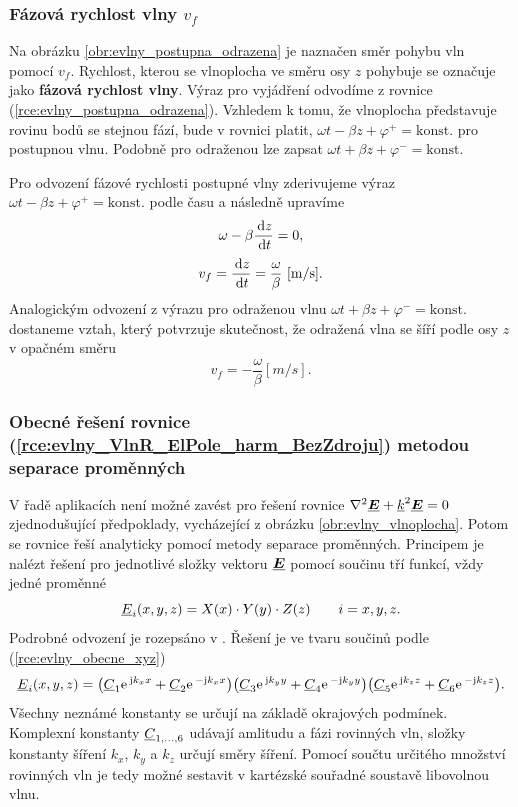 \subsubsection*{Fázová rychlost vlny $v_{f}$}
Na obrázku \ref{obr:evlny_postupna_odrazena} je naznačen směr pohybu vln pomocí $v_{f}$. Rychlost, kterou se vlnoplocha ve směru osy $z$ pohybuje se označuje jako {\bf fázová rychlost vlny}. Výraz pro vyjádření odvodíme z rovnice (\ref{rce:evlny_postupna_odrazena}). Vzhledem k tomu, že vlnoplocha představuje rovinu bodů se stejnou fází, bude v rovnici platit, $\omega t - \beta z + \varphi^{+} = \mathrm{konst.}$ pro postupnou vlnu. Podobně pro odraženou lze zapsat $\omega t + \beta z + \varphi^{-} = \mathrm{konst.}$

Pro odvození fázové rychlosti postupné vlny zderivujeme výraz $\omega t - \beta z + \varphi^{+} = \mathrm{konst.}$ podle času a následně upravíme
\begin{displaymath}
	\omega - \beta \frac{\,\mathrm{d} z}{\,\mathrm{d} t} = 0,
\end{displaymath}
\begin{displaymath}
	v_{f} = \frac{\,\mathrm{d} z}{\,\mathrm{d} t} = \frac{\omega}{\beta}\mathrm{\ [m/s]}.
\end{displaymath}
Analogickým odvození z výrazu pro odraženou vlnu  $\omega t + \beta z + \varphi^{-} = \mathrm{konst.}$ dostaneme vztah, který potvrzuje skutečnost, že odražená vlna se šíří podle osy $z$ v opačném směru 
\begin{displaymath}
	v_{f} = - \frac{\omega}{\beta}\unit{[m/s]}.
\end{displaymath}

\subsubsection*{Obecné řešení rovnice (\ref{rce:evlny_VlnR_ElPole_harm_BezZdroju}) metodou separace proměnných}
V řadě aplikacích není možné zavést pro řešení rovnice $\nabla^{2}\mbox{\underline{\boldmath$E$}} +{\underline{k}}^{2}\mbox{\underline{\boldmath$E$}} = 0$  zjednodušující předpoklady, vycházející z obrázku \ref{obr:evlny_vlnoplocha}. Potom se rovnice řeší analyticky pomocí metody separace proměnných. Principem je nalézt řešení pro jednotlivé složky vektoru $\mbox{\underline{\boldmath$E$}}$ pomocí součinu tří funkcí, vždy jedné proměnné
\begin{equation}
	{\underline{E}}_{i}(x,y,z) = X(x)\cdot Y(y)\cdot Z(z)\qquad i = x, y, z.
	\label{rce:evlny_obecne_xyz}
\end{equation}
Podrobné odvození je rozepsáno v \cite[str. 50]{emp}. Řešení je ve tvaru součinů podle (\ref{rce:evlny_obecne_xyz})
\begin{equation}
	{\underline{E}}_{i}(x,y,z) = \big( {\underline{C}}_{1}\mathrm{e\,}^{\mathrm{j} k_{x}x} +{\underline{C}}_{2}\mathrm{e\,}^{-\mathrm{j} k_{x}x} \big)\big({\underline{C}}_{3}\mathrm{e\,}^{\mathrm{j} k_{y}y} + {\underline{C}}_{4}\mathrm{e\,}^{-\mathrm{j} k_{y}y} \big)\big({\underline{C}}_{5}\mathrm{e\,}^{\mathrm{j} k_{z}z} + {\underline{C}}_{6}\mathrm{e\,}^{-\mathrm{j} k_{z}z} \big).
	\label{rce:evlny_obecne_reseni}
\end{equation}
Všechny neznámé konstanty se určují na základě okrajových podmínek. Komplexní konstanty ${\underline{C}}_{1,\ldots,6}$ udávají amlitudu a fázi rovinných vln, složky konstanty šíření $k_{x}$, $k_{y}$ a $k_{z}$ určují směry šíření. Pomocí součtu určitého množství rovinných vln je tedy možné sestavit v kartézské souřadné soustavě libovolnou vlnu.

